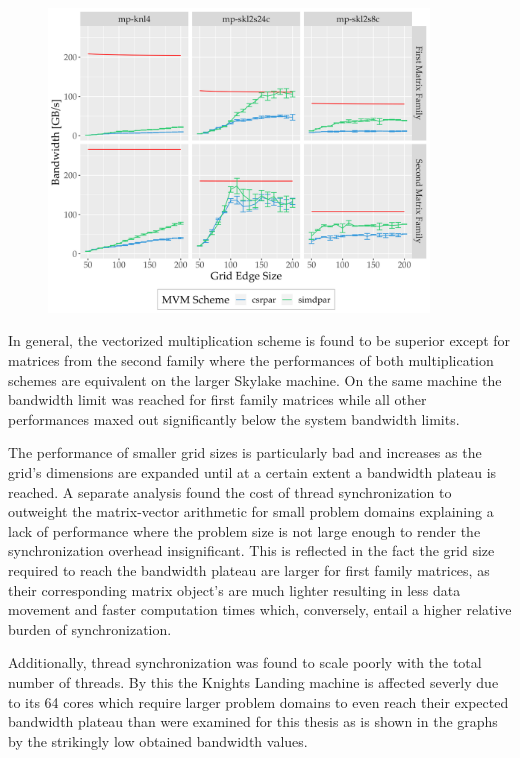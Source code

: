     \begin{figure}[H]
      \centering
      \captionsetup{width=0.9\textwidth}
      \includegraphics[width=0.9\textwidth]{assets/mvm-perturbed-new}
      \label{fig:mvm-perturbed-new}
    \end{figure}

     In general, the vectorized multiplication scheme is found to be superior except for matrices from the second family
     where the performances of both multiplication schemes are equivalent on the larger Skylake machine. On the same
     machine the bandwidth limit was reached for first family matrices while all other performances maxed out
     significantly below the system bandwidth limits.
 
     The performance of smaller grid sizes is particularly bad and increases as the grid's dimensions are expanded until
     at a certain extent a bandwidth plateau is reached. A separate analysis found the cost of thread synchronization to
     outweight the matrix-vector arithmetic for small problem domains explaining a lack of performance where the
     problem size is not large enough to render the synchronization overhead insignificant. This is reflected in the fact
     the grid size required to reach the bandwidth plateau are larger for first family matrices, as their corresponding
     matrix object's are much lighter resulting in less data movement and faster computation times which, conversely,
     entail a higher relative burden of synchronization.
 
     Additionally, thread synchronization was found to scale poorly with the total number of threads. By this the Knights
     Landing machine is affected severly due to its 64 cores which require larger problem domains to even reach their
     expected bandwidth plateau than were examined for this thesis as is shown in the graphs by the strikingly low
     obtained bandwidth values.
 
